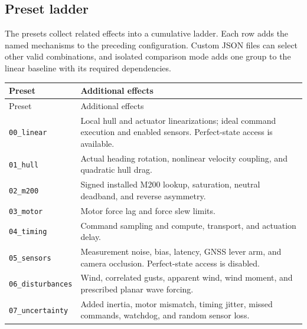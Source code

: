 \documentclass[10pt,letterpaper]{article}
\begin{document}
\subsection{Preset ladder}

The presets collect related effects into a cumulative ladder. Each row adds the named mechanisms to the preceding configuration. Custom JSON files can select other valid combinations, and isolated comparison mode adds one group to the linear baseline with its required dependencies.


{\footnotesize
\setlength{\tabcolsep}{5pt}
\renewcommand{\arraystretch}{1.18}
\begin{longtable}{@{}>{\raggedright\arraybackslash}p{}>{\raggedright\arraybackslash}p{}@{}}
\toprule
Preset & Additional effects \\
\midrule
\endfirsthead
\toprule
Preset & Additional effects \\
\midrule
\endhead
\bottomrule
\endfoot
\texttt{00\_linear} & Local hull and actuator linearizations; ideal command execution and enabled sensors. Perfect-state access is available. \\
\addlinespace[3pt]
\texttt{01\_hull} & Actual heading rotation, nonlinear velocity coupling, and quadratic hull drag. \\
\addlinespace[3pt]
\texttt{02\_m200} & Signed installed M200 lookup, saturation, neutral deadband, and reverse asymmetry. \\
\addlinespace[3pt]
\texttt{03\_motor} & Motor force lag and force slew limits. \\
\addlinespace[3pt]
\texttt{04\_timing} & Command sampling and compute, transport, and actuation delay. \\
\addlinespace[3pt]
\texttt{05\_sensors} & Measurement noise, bias, latency, GNSS lever arm, and camera occlusion. Perfect-state access is disabled. \\
\addlinespace[3pt]
\texttt{06\_disturbances} & Wind, correlated gusts, apparent wind, wind moment, and prescribed planar wave forcing. \\
\addlinespace[3pt]
\texttt{07\_uncertainty} & Added inertia, motor mismatch, timing jitter, missed commands, watchdog, and random sensor loss. \\
\end{longtable}
}
\end{document}
